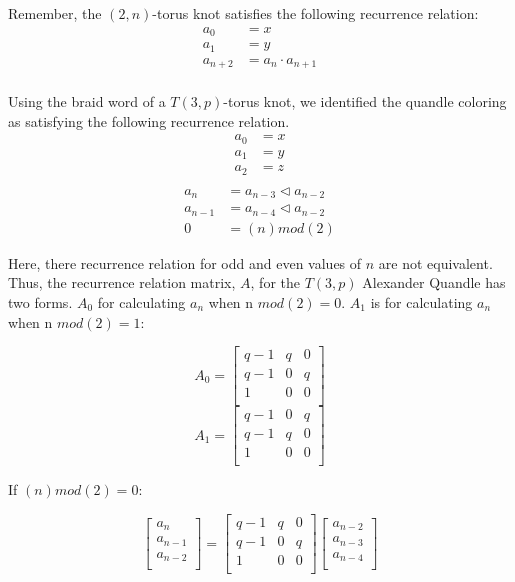 \documentclass[paper.tex]{subfiles}
\begin{document}
Remember, the $(2,n)$-torus knot satisfies the following recurrence relation:
\begin{align*}
	a_0 &= x \\
	a_1 &= y \\
	a_{n+2} &= a_{n} \cdot a_{n+1} \\
\end{align*}

Using the braid word of a $T(3,p)$-torus knot, we identified the quandle coloring as satisfying the following recurrence relation. 
\begin{align*}
	a_0 &= x \\
	a_1 &= y \\
	a_2 &= z \\
\end{align*}
\begin{align*}
	a_{n} &= a_{n-3} \triangleleft a_{n-2} \\
	a_{n-1} &= a_{n-4} \triangleleft a_{n-2} \\
	0 &= (n)mod(2)
\end{align*}

Here, there recurrence relation for odd and even values of $n$ are not equivalent. Thus, the recurrence relation matrix, $A$, for the $T(3, p)$ Alexander Quandle has two forms. $A_{0}$ for calculating $a_{n}$ when n $mod(2) = 0$.  $A_{1}$ is for calculating $a_{n}$ when n $mod(2) = 1$:

\[ A_{0} = 
\left[ \begin{array}{ccc}
q-1 & q & 0 \\
q-1 & 0 & q \\
1 & 0 & 0 \\
\end{array} \right]
\]
\[ A_{1} = 
\left[ \begin{array}{ccc}
q-1 & 0 & q \\
q-1 & q & 0 \\
1 & 0 & 0 \\
\end{array} \right]
\]

If $(n)mod(2) = 0$:

\[ 
\left[ \begin{array}{ccc}
a_{n} \\
a_{n-1} \\
a_{n-2} \\
\end{array} \right] 
=
\left[ \begin{array}{ccc}
q-1 & q & 0 \\
q-1 & 0 & q \\
1 & 0 & 0 \\
\end{array} \right]
\left[ \begin{array}{ccc}
a_{n-2} \\
a_{n-3} \\
a_{n-4} \\
\end{array} \right] 
\] 
\end{document}
